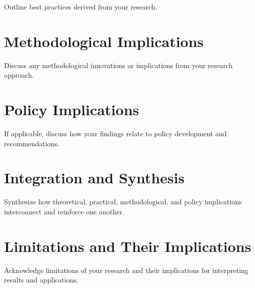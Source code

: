 Outline best practices derived from your research.

\section{Methodological Implications}

Discuss any methodological innovations or implications from your research approach.

\section{Policy Implications}

If applicable, discuss how your findings relate to policy development and recommendations.

\section{Integration and Synthesis}

Synthesize how theoretical, practical, methodological, and policy implications interconnect and reinforce one another.

\section{Limitations and Their Implications}

Acknowledge limitations of your research and their implications for interpreting results and applications.

\newpage
